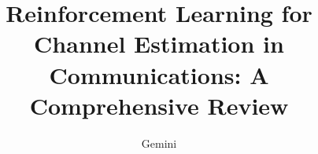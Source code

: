 \documentclass[journal,twocolumn]{IEEEtran}
\begin{document}
%
\title{Reinforcement Learning for Channel Estimation in Communications: A Comprehensive Review}
%
%
\author{Gemini%
}

%
%



%
\end{document}
